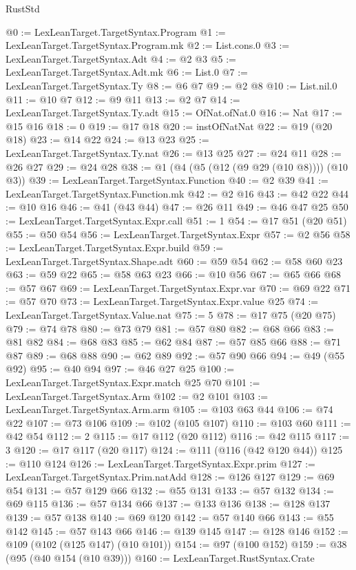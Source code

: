 \begin{lexlean}{RustStd}
\begin{coremodule}
{\begin{coremodule}
{{{{{{@0 := LexLeanTarget.TargetSyntax.Program
@1 := LexLeanTarget.TargetSyntax.Program.mk
@2 := List.cons.{0}
@3 := LexLeanTarget.TargetSyntax.Adt
@4 := @2 @3
@5 := LexLeanTarget.TargetSyntax.Adt.mk
@6 := List.{0}
@7 := LexLeanTarget.TargetSyntax.Ty
@8 := @6 @7
@9 := @2 @8
@10 := List.nil.{0}
@11 := @10 @7
@12 := @9 @11
@13 := @2 @7
@14 := LexLeanTarget.TargetSyntax.Ty.adt
@15 := OfNat.ofNat.{0}
@16 := Nat
@17 := @15 @16
@18 := 0
@19 := @17 @18
@20 := instOfNatNat
@22 := @19 (@20 @18)
@23 := @14 @22
@24 := @13 @23
@25 := LexLeanTarget.TargetSyntax.Ty.nat
@26 := @13 @25
@27 := @24 @11
@28 := @26 @27
@29 := @24 @28
@38 := @1 (@4 (@5 (@12 (@9 @29 (@10 @8)))) (@10 @3))
@39 := LexLeanTarget.TargetSyntax.Function
@40 := @2 @39
@41 := LexLeanTarget.TargetSyntax.Function.mk
@42 := @2 @16
@43 := @42 @22
@44 := @10 @16
@46 := @41 (@43 @44)
@47 := @26 @11
@49 := @46 @47 @25
@50 := LexLeanTarget.TargetSyntax.Expr.call
@51 := 1
@54 := @17 @51 (@20 @51)
@55 := @50 @54
@56 := LexLeanTarget.TargetSyntax.Expr
@57 := @2 @56
@58 := LexLeanTarget.TargetSyntax.Expr.build
@59 := LexLeanTarget.TargetSyntax.Shape.adt
@60 := @59 @54
@62 := @58 @60 @23
@63 := @59 @22
@65 := @58 @63 @23
@66 := @10 @56
@67 := @65 @66
@68 := @57 @67
@69 := LexLeanTarget.TargetSyntax.Expr.var
@70 := @69 @22
@71 := @57 @70
@73 := LexLeanTarget.TargetSyntax.Expr.value @25
@74 := LexLeanTarget.TargetSyntax.Value.nat
@75 := 5
@78 := @17 @75 (@20 @75)
@79 := @74 @78
@80 := @73 @79
@81 := @57 @80
@82 := @68 @66
@83 := @81 @82
@84 := @68 @83
@85 := @62 @84
@87 := @57 @85 @66
@88 := @71 @87
@89 := @68 @88
@90 := @62 @89
@92 := @57 @90 @66
@94 := @49 (@55 @92)
@95 := @40 @94
@97 := @46 @27 @25
@100 := LexLeanTarget.TargetSyntax.Expr.match @25 @70
@101 := LexLeanTarget.TargetSyntax.Arm
@102 := @2 @101
@103 := LexLeanTarget.TargetSyntax.Arm.arm
@105 := @103 @63 @44
@106 := @74 @22
@107 := @73 @106
@109 := @102 (@105 @107)
@110 := @103 @60
@111 := @42 @54
@112 := 2
@115 := @17 @112 (@20 @112)
@116 := @42 @115
@117 := 3
@120 := @17 @117 (@20 @117)
@124 := @111 (@116 (@42 @120 @44))
@125 := @110 @124
@126 := LexLeanTarget.TargetSyntax.Expr.prim
@127 := LexLeanTarget.TargetSyntax.Prim.natAdd
@128 := @126 @127
@129 := @69 @54
@131 := @57 @129 @66
@132 := @55 @131
@133 := @57 @132
@134 := @69 @115
@136 := @57 @134 @66
@137 := @133 @136
@138 := @128 @137
@139 := @57 @138
@140 := @69 @120
@142 := @57 @140 @66
@143 := @55 @142
@145 := @57 @143 @66
@146 := @139 @145
@147 := @128 @146
@152 := @109 (@102 (@125 @147) (@10 @101))
@154 := @97 (@100 @152)
@159 := @38 (@95 (@40 @154 (@10 @39)))
@160 := LexLeanTarget.RustSyntax.Crate
}}}}}}
\end{coremodule}}
\end{coremodule}
\end{lexlean}
